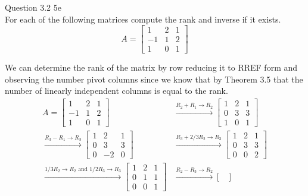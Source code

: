 \documentclass[answers,12pt,addpoints]{exam}
\begin{document}
\begin{questions}
\begin{solution}
    \end{solution}

    \question Question 3.2 5e\\
    For each of the following matrices compute the rank and inverse if it exists.\\
    $$ A = \begin{bmatrix}
        1 & 2 & 1\\
        -1 & 1 & 2\\
        1 & 0 & 1
    \end{bmatrix}$$
    \begin{solution}
        We can determine the rank of the matrix by row reducing it to RREF form and observing the number pivot columns since we know that by Theorem 3.5 that the number of linearly independent columns is equal to the rank.\\
        \begin{align*}
            A = \begin{bmatrix}
                1 & 2 & 1\\
                -1 & 1 & 2\\
                1 & 0 & 1
            \end{bmatrix} &\xrightarrow{R_2 + R_1 \to R_2} \begin{bmatrix}
                1 & 2 & 1\\
                0 & 3 & 3\\
                1 & 0 & 1
            \end{bmatrix}\\ 
            \xrightarrow{R_3 - R_1 \to R_3} \begin{bmatrix}
                1 & 2 & 1\\
                0 & 3 & 3\\
                0 & -2 & 0
            \end{bmatrix} &\xrightarrow{R_3 + 2/3 R_2 \to R_3} \begin{bmatrix}
                1 & 2 & 1\\
                0 & 3 & 3\\
                0 & 0 & 2
            \end{bmatrix} \\
            \xrightarrow{ 1/3 R_2 \to R_2 \text{ and }  1/2 R_3  \to R_3} \begin{bmatrix}
                1 & 2 & 1\\
                0 & 1 & 1\\
                0 & 0 & 1
            \end{bmatrix} & \xrightarrow{R_2 - R_3 \to R_2} \begin{bmatrix}

\end{bmatrix}
\end{align*}
\end{solution}
\end{questions}
\end{document}
